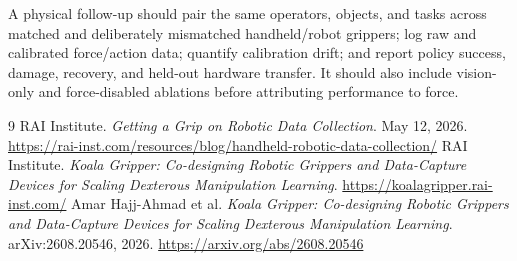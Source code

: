 \documentclass[11pt]{article}
\begin{document}
A physical follow-up should pair the same operators, objects, and tasks across matched and deliberately mismatched handheld/robot grippers; log raw and calibrated force/action data; quantify calibration drift; and report policy success, damage, recovery, and held-out hardware transfer. It should also include vision-only and force-disabled ablations before attributing performance to force.

\begin{thebibliography}{9}
 RAI Institute. \emph{Getting a Grip on Robotic Data Collection}. May 12, 2026. \url{https://rai-inst.com/resources/blog/handheld-robotic-data-collection/}
 RAI Institute. \emph{Koala Gripper: Co-designing Robotic Grippers and Data-Capture Devices for Scaling Dexterous Manipulation Learning}. \url{https://koalagripper.rai-inst.com/}
 Amar Hajj-Ahmad et al. \emph{Koala Gripper: Co-designing Robotic Grippers and Data-Capture Devices for Scaling Dexterous Manipulation Learning}. arXiv:2608.20546, 2026. \url{https://arxiv.org/abs/2608.20546}
\end{thebibliography}
\end{document}
